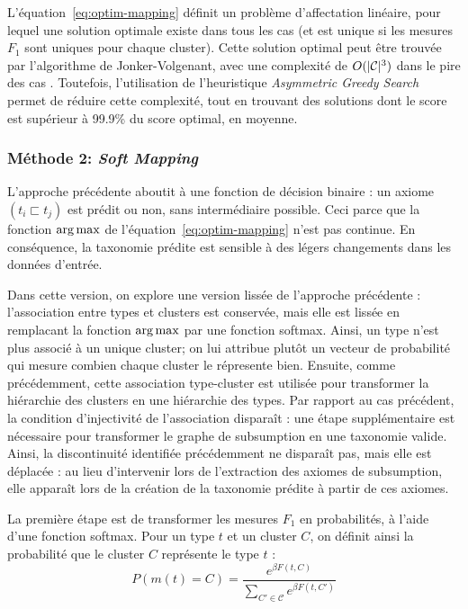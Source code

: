 L'équation~\ref{eq:optim-mapping} définit un problème d'affectation linéaire, pour lequel une solution optimale existe dans tous les cas (et est unique si les mesures $F_1$ sont uniques pour chaque cluster).
Cette solution optimal peut être trouvée par l'algorithme de Jonker-Volgenant, avec une complexité de $O(|\mathcal{C}|^3)$ dans le pire des cas \cite{jonker1987shortest}. Toutefois, l'utilisation de l'heuristique \textit{Asymmetric Greedy Search} \cite{brown2017heuristic} permet de réduire cette complexité, tout en trouvant des solutions dont le score est supérieur à 99.9\% du score optimal, en moyenne.

\subsubsection{Méthode 2: \textit{Soft Mapping}}
\label{ssubsec:te-softmapping}

L'approche précédente aboutit à une fonction de décision binaire : un axiome $(t_i \sqsubset t_j)$ est prédit ou non, sans intermédiaire possible. Ceci parce que la fonction $\operatorname*{arg\,max}$ de l'équation~\ref{eq:optim-mapping} n'est pas continue. En conséquence, la taxonomie prédite est sensible à des légers changements dans les données d'entrée.

Dans cette version, on explore une version lissée de l'approche précédente : l'association entre types et clusters est conservée, mais elle est lissée en remplacant la fonction $\operatorname*{arg\,max}$ par une fonction softmax. Ainsi, un type n'est plus associé à un unique cluster; on lui attribue plutôt un vecteur de probabilité qui mesure combien chaque cluster le répresente bien. Ensuite, comme précédemment, cette association type-cluster est utilisée pour transformer la hiérarchie des clusters en une hiérarchie des types. Par rapport au cas précédent, la condition d'injectivité de l'association disparaît : une étape supplémentaire est nécessaire pour transformer le graphe de subsumption en une taxonomie valide. Ainsi, la discontinuité identifiée précédemment ne disparaît pas, mais elle est déplacée : au lieu d'intervenir lors de l'extraction des axiomes de subsumption, elle apparaît lors de la création de la taxonomie prédite à partir de ces axiomes. 

La première étape est de transformer les mesures $F_1$ en probabilités, à l'aide d'une fonction softmax. Pour un type $t$ et un cluster $C$, on définit ainsi la probabilité que le cluster $C$ représente le type $t$ :
\begin{equation}
    P(m(t) = C) = \frac{\displaystyle e^{ \beta F(t, C)}}{\displaystyle \sum_{C' \in \mathcal{C}} e^{\beta F(t, C')}}
\end{equation}

